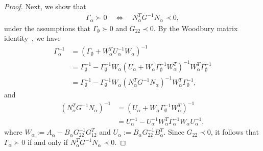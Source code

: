\documentclass{article}
\begin{document}
\begin{proof}
		Next, we show that
		\begin{align*}
			\Gamma_{\alpha}\succ 0
			\quad \Longleftrightarrow \quad
			N_{\alpha}^{T}G^{-1}N_{\alpha} \prec 0,
		\end{align*}
		under the assumptions that $\Gamma_{\emptyset} \succ 0$ and $G_{22} \prec 0$.
		By the Woodbury matrix identity~\cite{highamAccuracyStabilityNumerical2002}, we have
		\begin{align*}
			\Gamma_{\alpha}^{-1}
			&= (\Gamma_{\emptyset} + W_{\alpha}^{T}U_{\alpha}^{-1}W_{\alpha})^{-1}\\
			&= \Gamma_{\emptyset}^{-1}
			- \Gamma_{\emptyset}^{-1}W_{\alpha}
			(U_{\alpha} + W_{\alpha}\Gamma_{\emptyset}^{-1}W_{\alpha}^{T})^{-1}
			W_{\alpha}^{T}\Gamma_{\emptyset}^{-1}\\
			&= \Gamma_{\emptyset}^{-1}
			- \Gamma_{\emptyset}^{-1}W_{\alpha}
			(N_{\alpha}^{T}G^{-1}N_{\alpha})^{-1}
			W_{\alpha}^{T}\Gamma_{\emptyset}^{-1},
		\end{align*}
		and
		\begin{align*}
			(N_{\alpha}^{T}G^{-1}N_{\alpha})^{-1}
			&= (U_{\alpha} + W_{\alpha}\Gamma_{\emptyset}^{-1}W_{\alpha}^{T})^{-1}\\
			&= U_{\alpha}^{-1}
			- U_{\alpha}^{-1}W_{\alpha}^{T}\Gamma_{\alpha}^{-1}W_{\alpha}U_{\alpha}^{-1},
		\end{align*}
		where $W_{\alpha} := A_{\alpha} - B_{\alpha}G_{22}^{-1}G_{12}^{T}$ and
		$U_{\alpha} := B_{\alpha}G_{22}^{-1}B_{\alpha}^{T}$.
		Since $G_{22} \prec 0$, it follows that $\Gamma_{\alpha} \succ 0$ if and only if
		$N_{\alpha}^{T}G^{-1}N_{\alpha} \prec 0$.
		

\end{proof}
\end{document}
